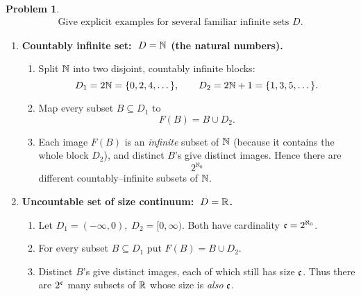 \documentclass[12pt]{article}
\theoremstyle{definition} %
\newtheorem{problem}{Problem}
\theoremstyle{plain} %
\begin{document}
\begin{problem}
    \begin{align}
        \text{Give explicit examples for several familiar infinite sets $D$.}
    \end{align}

    \begin{enumerate}
    \item \textbf{Countably infinite set: $\;D=\Bbb N$ (the natural numbers).}

          \begin{enumerate}
              \item Split $\Bbb N$ into two disjoint, countably infinite
                    blocks:
                    \[
                        D_{1}=2\Bbb N=\{0,2,4,\dots\},
                        \qquad
                        D_{2}=2\Bbb N+1=\{1,3,5,\dots\}.
                    \]
              \item Map every subset $B\subseteq D_{1}$ to
                    \[
                        F(B)=B\cup D_{2}.
                    \]
              \item Each image $F(B)$ is an \emph{infinite} subset of $\Bbb N$
                    (because it contains the whole block $D_{2}$), and
                    distinct $B$’s give distinct images.  Hence there are
                    \[
                        2^{\aleph_{0}}
                    \]
                    different countably–infinite subsets of $\Bbb N$.
          \end{enumerate}

    \item \textbf{Uncountable set of size continuum: $\;D=\Bbb R$.}

          \begin{enumerate}
              \item Let
                    \(
                        D_{1}=(-\infty,0),\;
                        D_{2}=[0,\infty).
                    \)
                    Both have cardinality $\frak c=2^{\aleph_{0}}$.
              \item For every subset $B\subseteq D_{1}$ put
                    \(
                        F(B)=B\cup D_{2}.
                    \)
              \item Distinct $B$’s give distinct images, each of which still
                    has size $\frak c$.  Thus there are $2^{\frak c}$ many
                    subsets of $\Bbb R$ whose size is \emph{also} $\frak c$.
          \end{enumerate}


\end{enumerate}
\end{problem}
\end{document}
